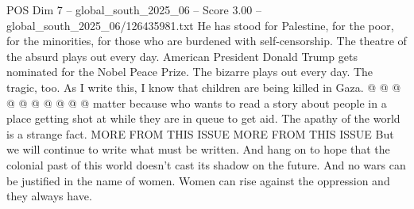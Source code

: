 \begin{textsample}{POS Dim 7 – global\_south\_2025\_06 – Score 3.00 – global\_south\_2025\_06/126435981.txt}
He has stood for Palestine, for the poor, for the minorities, for those who are burdened with self-censorship.
The theatre of the absurd plays out every day.
American President Donald Trump gets nominated for the Nobel Peace Prize.
The bizarre plays out every day.
The tragic, too.
As I write this, I know that children are being killed in Gaza. @ @ @ @ @ @ @ @ @ @ matter because who wants to read a story about people in a place getting shot at while they are in queue to get aid.
The apathy of the world is a strange fact.
MORE FROM THIS ISSUE MORE FROM THIS ISSUE But we will continue to write what must be written.
And hang on to hope that the colonial past of this world doesn't cast its shadow on the future.
And no wars can be justified in the name of women.
Women can rise against the oppression and they always have.

\end{textsample}
